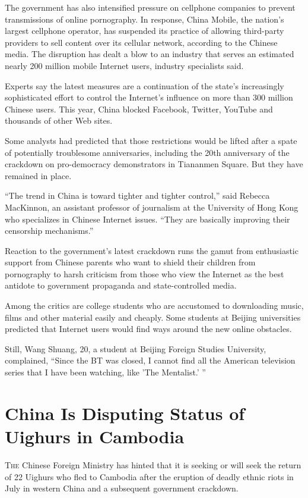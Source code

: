 ﻿\documentclass[12pt]{article}
\begin{document}
The government has also intensified pressure on cellphone companies to prevent transmissions of
online pornography. In response, China Mobile, the nation's largest cellphone operator, has
suspended its practice of allowing third-party providers to sell content over its cellular network,
according to the Chinese media. The disruption has dealt a blow to an industry that serves an
estimated nearly 200 million mobile Internet users, industry specialists said.

Experts say the latest measures are a continuation of the state's increasingly sophisticated effort
to control the Internet's influence on more than 300 million Chinese users. This year, China blocked
Facebook, Twitter, YouTube and thousands of other Web sites.

Some analysts had predicted that those restrictions would be lifted after a spate of potentially
troublesome anniversaries, including the 20th anniversary of the crackdown on pro-democracy
demonstrators in Tiananmen Square. But they have remained in place.

``The trend in China is toward tighter and tighter control,'' said Rebecca MacKinnon, an assistant
professor of journalism at the University of Hong Kong who specializes in Chinese Internet issues.
``They are basically improving their censorship mechanisms.''

Reaction to the government's latest crackdown runs the gamut from enthusiastic support from Chinese
parents who want to shield their children from pornography to harsh criticism from those who view
the Internet as the best antidote to government propaganda and state-controlled media.

Among the critics are college students who are accustomed to downloading music, films and other
material easily and cheaply. Some students at Beijing universities predicted that Internet users
would find ways around the new online obstacles.

Still, Wang Shuang, 20, a student at Beijing Foreign Studies University, complained, ``Since the BT
was closed, I cannot find all the American television series that I have been watching, like 'The
Mentalist.' ''

\section{China Is Disputing Status of Uighurs in Cambodia}

\lettrine{T}{he} Chinese Foreign Ministry has hinted that it is seeking or
will seek the return of 22 Uighurs who fled to Cambodia after the eruption of deadly ethnic riots in
July in western China and a subsequent government crackdown.
\end{document}
